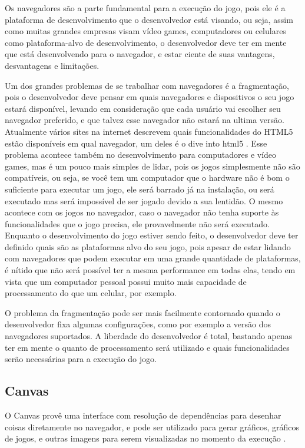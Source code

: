 Os navegadores são a parte fundamental para a execução do jogo, pois
ele é a plataforma de desenvolvimento que o desenvolvedor está visando,
ou seja, assim como muitas grandes empresas visam vídeo games,
computadores ou celulares como plataforma-alvo de desenvolvimento, o
desenvolvedor deve ter em mente que está desenvolvendo para o
navegador, e estar ciente de suas vantagens, desvantagens e
limitações.

Um dos grandes problemas de se trabalhar com navegadores é a
fragmentação, pois o desenvolvedor deve pensar em quais navegadores e
dispositivos o seu jogo estará disponível, levando em consideração
que cada usuário vai escolher seu navegador preferido, e que talvez
esse navegador não estará na ultima versão. Atualmente vários sites na
internet descrevem quais funcionalidades do HTML5 estão disponíveis em
qual navegador, um deles é o dive into html5 \cite{website:diveintohtml5}.
Esse problema acontece também no desenvolvimento para computadores e
vídeo games, mas é um pouco mais simples de lidar, pois os jogos
simplesmente não são compatíveis, ou seja, se você tem um computador
que o hardware não é bom o suficiente para executar um jogo, ele será
barrado já na instalação, ou será executado mas será impossível de ser
jogado devido a sua lentidão. O mesmo acontece com os jogos no
navegador, caso o navegador não tenha suporte às funcionalidades que o
jogo precisa, ele provavelmente não será executado. Enquanto o
desenvolvimento do jogo estiver sendo feito, o desenvolvedor deve ter
definido quais são as plataformas alvo do seu jogo, pois apesar de
estar lidando com navegadores que podem executar em uma grande
quantidade de plataformas, é nítido que não será possível ter a mesma
performance em todas elas, tendo em vista que um computador pessoal
possui muito mais capacidade de processamento do que um celular, por
exemplo.

O problema da fragmentação pode ser mais facilmente contornado quando
o desenvolvedor fixa algumas configurações, como por exemplo a versão
dos navegadores suportados. A liberdade do desenvolvedor é total,
bastando apenas ter em mente o quanto de processamento será utilizado
e quais funcionalidades serão necessárias para a execução do jogo.

\subsection{Canvas}

O Canvas provê uma interface com resolução de dependências para
desenhar coisas diretamente no navegador, e pode ser utilizado para
gerar gráficos, gráficos de jogos, e outras imagens para serem
visualizadas no momento da execução \cite{website:w3ccanvas}.

